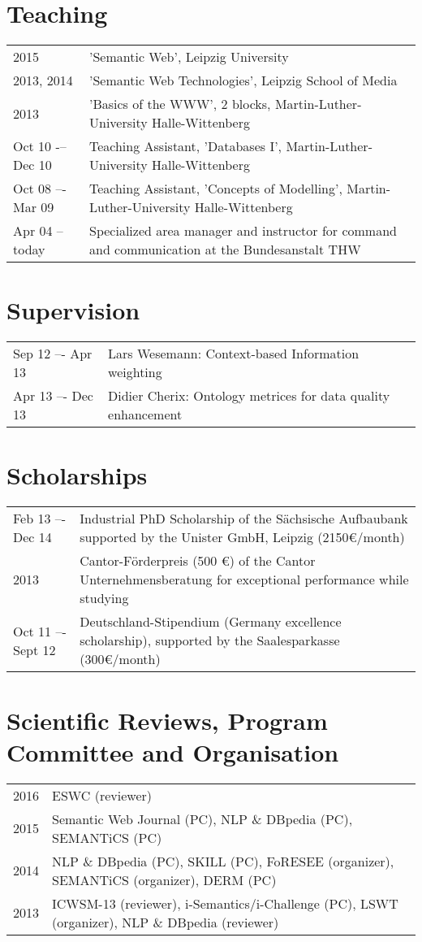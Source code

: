 \section*{Teaching}
\begin{tabular}{p{3cm}p{10cm}}	
2015		    & 'Semantic Web', Leipzig University\\
2013, 2014	    & 	'Semantic Web Technologies', Leipzig School of Media\\
2013		    & 'Basics of the WWW', 2 blocks, Martin-Luther-University Halle-Wittenberg\\
Oct 10 -– Dec 10	& 	Teaching Assistant, 'Databases I', Martin-Luther-University Halle-Wittenberg\\
Oct 08 –- Mar 09	& 	Teaching Assistant, 'Concepts of Modelling', Martin-Luther-University Halle-Wittenberg\\
Apr 04 -- today	& Specialized area manager and instructor for command and communication at the Bundesanstalt THW\\
\end{tabular}

\section*{Supervision}
\begin{tabular}{p{3cm}p{10cm}}	
Sep 12 –- Apr 13 	& 	Lars Wesemann: Context-based Information weighting\\
Apr 13 –- Dec 13 	& 	Didier Cherix: Ontology metrices for data quality enhancement
\end{tabular}

\section*{Scholarships}
\begin{tabular}{p{3cm}p{10cm}}	
Feb 13 –- Dec 14 	& 	Industrial PhD Scholarship of the Sächsische Aufbaubank supported by the Unister GmbH, Leipzig (2150€/month)\\
2013	        	&   Cantor-Förderpreis (500 €) of the Cantor Unternehmensberatung for exceptional performance while studying\\
Oct 11 –- Sept 12 	& 	Deutschland-Stipendium (Germany excellence scholarship), supported by the Saalesparkasse (300€/month)\\
\end{tabular}

\section*{Scientific Reviews, Program Committee and Organisation}
\begin{tabular}{p{3cm}p{10cm}}	
2016        & ESWC (reviewer)\\
2015        & Semantic Web Journal (PC), NLP \& DBpedia (PC), SEMANTiCS (PC)\\
2014		& NLP \& DBpedia (PC), SKILL (PC), FoRESEE (organizer), SEMANTiCS  (organizer), DERM (PC)\\
2013		& ICWSM-13 (reviewer), i-Semantics/i-Challenge (PC), LSWT (organizer), NLP \& DBpedia (reviewer)\\
\end{tabular}

